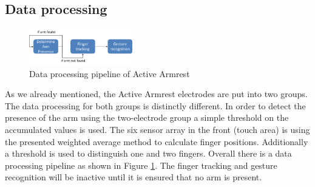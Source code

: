 \subsection{Data processing}
\begin{figure}[h]
\centering
\includegraphics[width=0.4\textwidth]{images/armrest_dataproc}
\caption{Data processing pipeline of Active Armrest}
\label{fig:armrest_dataproc}
\end{figure}
As we already mentioned, the Active Armrest electrodes are put into two groups. The data processing for both groups is distinctly different. In order to detect the presence of the arm using the two-electrode group a simple threshold on the accumulated values is used. The six sensor array in the front (touch area) is using the presented weighted average method to calculate finger positions. Additionally a threshold is used to distinguish one and two fingers. Overall there is a data processing pipeline as shown in Figure \ref{fig:armrest_dataproc}. The finger tracking and gesture recognition will be inactive until it is ensured that no arm is present. 
